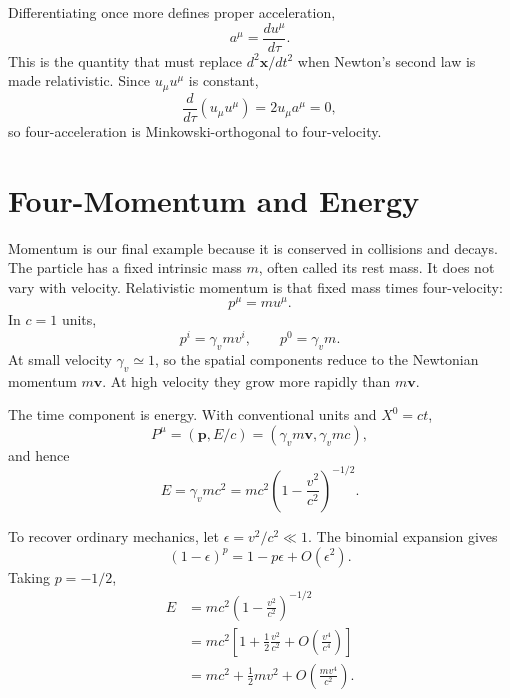Differentiating once more defines proper acceleration,
\begin{equation}
a^\mu=\frac{du^\mu}{d\tau}.
\end{equation}
This is the quantity that must replace \(d^2\mathbf x/dt^2\) when Newton's
second law is made relativistic. Since \(u_\mu u^\mu\) is constant,
\begin{equation}
\frac{d}{d\tau}(u_\mu u^\mu)=2u_\mu a^\mu=0,
\end{equation}
so four-acceleration is Minkowski-orthogonal to four-velocity.

\section{Four-Momentum and Energy}

Momentum is our final example because it is conserved in collisions and decays.
The particle has a fixed intrinsic mass \(m\), often called its rest mass. It
does not vary with velocity. Relativistic momentum is that fixed mass times
four-velocity:
\begin{equation}
p^\mu=mu^\mu.
\label{eq:l5-four-momentum}
\end{equation}
In \(c=1\) units,
\begin{equation}
p^i=\gamma_v m v^i,
\qquad
p^0=\gamma_v m.
\end{equation}
At small velocity \(\gamma_v\simeq1\), so the spatial components reduce to
the Newtonian momentum \(m\mathbf v\). At high velocity they grow more rapidly
than \(m\mathbf v\).

The time component is energy. With conventional units and \(X^0=ct\),
\begin{equation}
P^\mu=(\mathbf p,E/c)
=(\gamma_v m\mathbf v,\gamma_v mc),
\end{equation}
and hence
\begin{equation}
E=\gamma_v mc^2
=mc^2\left(1-\frac{v^2}{c^2}\right)^{-1/2}.
\label{eq:l5-relativistic-energy}
\end{equation}

To recover ordinary mechanics, let
\(\epsilon=v^2/c^2\ll1\). The binomial expansion gives
\begin{equation}
(1-\epsilon)^p=1-p\epsilon+O(\epsilon^2).
\end{equation}
Taking \(p=-1/2\),
\begin{align}
E
&=mc^2\left(1-\frac{v^2}{c^2}\right)^{-1/2}\nonumber\\
&=mc^2\left[1+\frac12\frac{v^2}{c^2}
  +O\!\left(\frac{v^4}{c^4}\right)\right]\nonumber\\
&=mc^2+\frac12mv^2+O\!\left(\frac{mv^4}{c^2}\right).
\label{eq:l5-energy-expansion}
\end{align}

